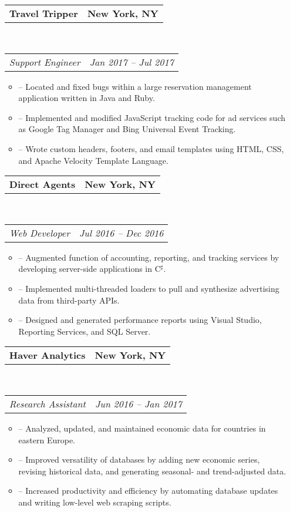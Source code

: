 \documentclass[11pt,letterpaper]{article}
\makeatletter
\newenvironment{shortlist}
{\setlength{\linewidth}{0.9\linewidth}
\begin{itemize}
}
{\end{itemize}}
\newcommand{\headerrow}[2]
{\begin{tabular*}{\linewidth}{l@{\extracolsep{\fill}}r}
	#1 &
	#2 \\
\end{tabular*}}
\makeatother
\begin{document}
\begin{itemize}
	\parskip=0.1em

    \item[]
	\headerrow
		{\textbf{Travel Tripper}}
        {\textbf{New York, NY}}
	\\
	\headerrow
		{\emph{Support Engineer}}
		{\emph{Jan 2017 -- Jul 2017}}
    \begin{shortlist}
        \item[--]
        Located and fixed bugs within a large reservation management application written in Java
        and Ruby.


        \item[--]
        Implemented and modified JavaScript tracking code for ad services such as Google Tag
        Manager and Bing Universal Event Tracking.

        \item[--]
        Wrote custom headers, footers, and email templates using HTML, CSS, and Apache Velocity
        Template Language.
    \end{shortlist}

    \item[]
	\headerrow
		{\textbf{Direct Agents}}
		{\textbf{New York, NY}}
	\\
	\headerrow
		{\emph{Web Developer}}
		{\emph{Jul 2016 -- Dec 2016}}
	\begin{shortlist}
        \item[--]
        Augmented function of accounting, reporting, and tracking services by developing server-side
        applications in C$^\sharp$.

        \item[--]
        Implemented multi-threaded loaders to pull and synthesize advertising data from third-party
        APIs.

        \item[--]
        Designed and generated performance reports using Visual Studio, Reporting Services, and
        SQL Server.

	\end{shortlist}

    \item[]
	\headerrow
		{\textbf{Haver Analytics}}
		{\textbf{New York, NY}}
	\\
	\headerrow
		{\emph{Research Assistant}}
		{\emph{Jun 2016 -- Jan 2017}}
	\begin{shortlist}
        \item[--]
        Analyzed, updated, and maintained economic data for countries in eastern Europe.
        \item[--]
        Improved versatility of databases by adding new economic series, revising historical data, and
        generating seasonal- and trend-adjusted data.
        \item[--]
        Increased productivity and efficiency by automating database 
        updates and writing low-level web scraping scripts.


\end{shortlist}
\end{itemize}
\end{document}
